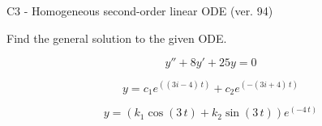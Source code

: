 \begin{exercise}
  \begin{exerciseTitle}C3 - Homogeneous second-order linear ODE (ver. 94)\end{exerciseTitle}
  \begin{exerciseStatement}
    
Find the general solution to the given ODE.

    
\[y''+8y'+25y = 0\]

  \end{exerciseStatement}
  \begin{exerciseAnswer}
    
\[y= c_{1} e^{\left(\left(3 i - 4\right) \, t\right)} + c_{2} e^{\left(-\left(3 i + 4\right) \, t\right)}\]

    
\[y= {\left(k_{1} \cos\left(3 \, t\right) + k_{2} \sin\left(3 \, t\right)\right)} e^{\left(-4 \, t\right)}\]

  \end{exerciseAnswer}
\end{exercise}